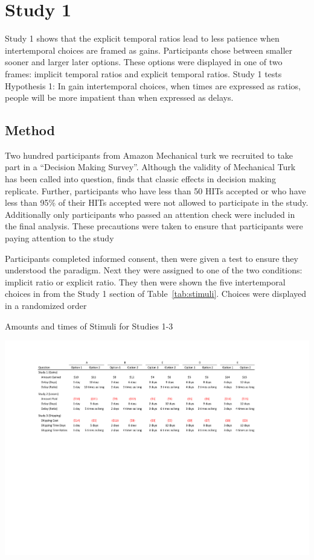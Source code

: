 \documentclass[]{article}
\begin{document}
\section{Study 1}
Study 1 shows that the explicit temporal ratios lead to less patience when intertemporal choices are framed as gains.
Participants chose between smaller sooner and larger later options. 
These options were displayed in one of two frames: implicit temporal ratios and explicit temporal ratios. 
Study 1 tests Hypothesis 1: In gain intertemporal choices, when times are expressed as ratios, people will be more impatient than when expressed as delays. 

\subsection{Method}
Two hundred participants from Amazon Mechanical turk we recruited to take part in a ``Decision Making Survey''. 
Although the validity of Mechanical Turk has been called into question,  finds that classic effects in decision making replicate. 
Further, participants who have less than 50 HITs accepted or  who have less than 95\% of their HITs accepted were not allowed to participate in the study. 
Additionally only participants who passed an attention check were included in the final analysis.
These precautions were taken to ensure that participants were paying attention to the study 

Participants completed informed consent, then were given a test to ensure they understood the paradigm.
Next they were assigned to one of the two conditions: implicit ratio or explicit ratio. 
They then were shown the five intertemporal choices in from the Study 1 section of  Table~\ref{tab:stimuli}. 
Choices were displayed in a randomized order


\begin{landscape}
\begin{table}[!ht]
	\caption{Amounts and times of Stimuli for Studies 1-3} 
	\label{tab:stimuli}
	\includegraphics[]{Stimuli_For_Study.pdf}
\end{table}
\end{landscape}
\end{document}

